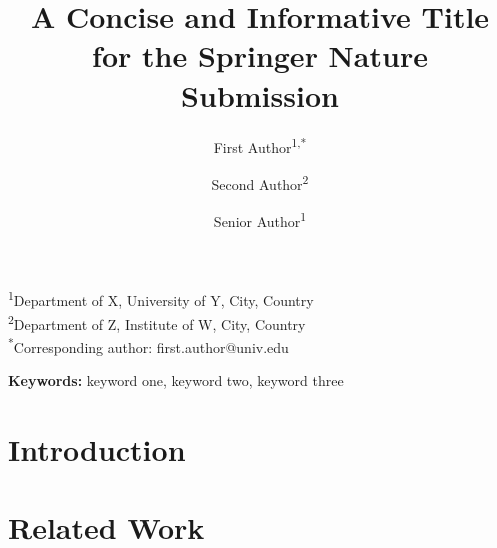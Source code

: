 \documentclass[11pt,a4paper]{article}
\title{A Concise and Informative Title for the Springer Nature Submission}
\author{First Author\textsuperscript{1,*} \and Second Author\textsuperscript{2} \and Senior Author\textsuperscript{1}}
\date{}
\begin{document}
\maketitle

\noindent\textsuperscript{1}Department of X, University of Y, City, Country\\
\textsuperscript{2}Department of Z, Institute of W, City, Country\\
\textsuperscript{*}Corresponding author: first.author@univ.edu

\vspace{1em}

\begin{abstract}
\end{abstract}

\noindent\textbf{Keywords:} %
keyword one, keyword two, keyword three

\vspace{1em}

\section{Introduction}
\label{sec:intro}

\section{Related Work}
\label{sec:related}
\end{document}
